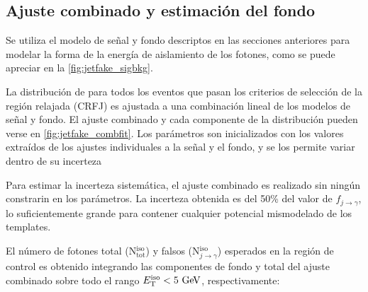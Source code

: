 
\subsection{Ajuste combinado y estimación del fondo} \label{sec:jet_fake_results}

Se utiliza el modelo de señal y fondo descriptos en las secciones anteriores para
modelar la forma de la energía de aislamiento de los fotones, como se puede
apreciar en la \cref{fig:jetfake_sigbkg}.

La distribución de {\etiso} para todos los eventos que pasan los criterios de
selección de la región relajada (CRFJ) es ajustada a una combinación lineal de
los modelos de señal y fondo. El ajuste combinado y cada componente de la
distribución pueden verse en \cref{fig:jetfake_combfit}. Los parámetros son
inicializados con los valores extraídos de los ajustes individuales a la señal y
el fondo, y se los permite variar dentro de su incerteza

Para estimar la incerteza sistemática, el ajuste combinado es realizado
sin ningún constrarin en los parámetros. La incerteza obtenida es del
50\% del valor de $f_{j\to\gamma}$, lo suficientemente grande para contener
cualquier potencial mismodelado de los templates.


El número de fotones total (N$_\text{tot}^\text{iso}$) y falsos
(N$_{j\to\gamma}^\text{iso}$) esperados en la región de control es obtenido
integrando las componentes de fondo y total del ajuste combinado sobre todo el
rango $\etiso<5\gev$, respectivamente:

